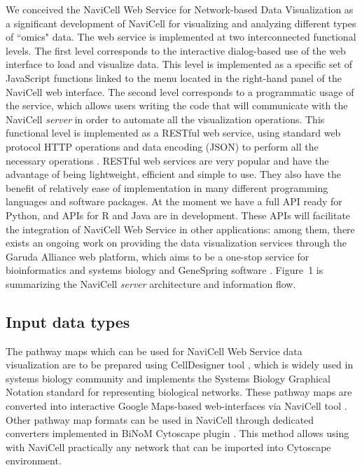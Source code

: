\documentclass[a4,center,fleqn]{NAR}
\begin{document}
We conceived the NaviCell Web Service for Network-based Data Visualization
as a significant development of NaviCell \cite{kuperstein2013navicell}
for visualizing and analyzing different types of ``omics" data. The web service
is implemented at two interconnected functional levels.
The first level corresponds to the interactive dialog-based
use of the web interface to load and visualize data. This level is implemented
as a specific set of JavaScript functions linked to the menu located
in the right-hand panel of the NaviCell web interface. The second level corresponds to a
programmatic usage of the service, which allows users writing the code that will
communicate with the NaviCell \emph{server} in order to automate all the
visualization operations. This functional level is implemented as a RESTful web
service, using standard web protocol HTTP operations and data encoding (JSON)
to perform all the necessary operations \cite{fielding2002principled}.
RESTful web services are very popular and have the advantage of being
lightweight, efficient and simple to use. They also have the benefit of
relatively ease of implementation in many different programming languages and
software packages. At the moment we have a full API ready for Python, and
APIs for R and Java are in development. These APIs will facilitate the integration
of NaviCell Web Service in other applications: among them, there exists an
ongoing work on providing the data visualization services through the Garuda
Alliance web platform, which aims to be a one-stop service for bioinformatics
and systems biology \cite{ghosh2011software} and GeneSpring software
\cite{Chu2001}. Figure~1 is summarizing the NaviCell \emph{server} architecture
and information flow.

\subsection{Input data types}

The pathway maps which can be used for NaviCell Web Service data visualization
are to be prepared using CellDesigner tool \cite{Funahashi2008}, which is widely used in systems biology
community and implements the Systems Biology Graphical Notation standard \cite{LeNovere2009}
for representing biological networks. These pathway maps are converted into
interactive Google Maps-based web-interfaces via NaviCell tool \cite{kuperstein2013navicell}.
Other pathway map formats can be used in NaviCell through dedicated converters implemented
in BiNoM Cytoscape plugin \cite{Zinovyev2008,Bonnet2013a}.
This method allows using with NaviCell practically any network that can be imported into Cytoscape environment.
\end{document}
